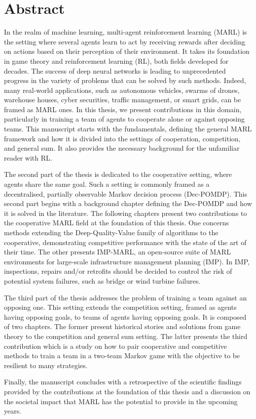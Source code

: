 
\chapter*{Abstract}

In the realm of machine learning, multi-agent reinforcement learning (MARL) is the setting where several agents learn to act by receiving rewards after deciding on actions based on their perception of their environment.
It takes its foundation in game theory and reinforcement learning (RL), both fields developed for decades.
The success of deep neural networks is leading to unprecedented progress in the variety of problems that can be solved by such methods.
Indeed, many real-world applications, such as autonomous vehicles, swarms of drones, warehouse houses, cyber securities, traffic management, or smart grids, can be framed as MARL ones.
In this thesis, we present contributions in this domain, particularly in training a team of agents to cooperate alone or against opposing teams.
This manuscript starts with the fundamentals, defining the general MARL framework and how it is divided into the settings of cooperation, competition, and general sum.
It also provides the necessary background for the unfamiliar reader with RL.

The second part of the thesis is dedicated to the cooperative setting, where agents share the same goal.
Such a setting is commonly framed as a decentralised, partially observable Markov decision process (Dec-POMDP).
This second part begins with a background chapter defining the Dec-POMDP and how it is solved in the literature.
The following chapters present two contributions to the cooperative MARL field at the foundation of this thesis.
One concerns methods extending the Deep-Quality-Value family of algorithms to the cooperative, demonstrating competitive performance with the state of the art of their time.
The other presents IMP-MARL, an open-source suite of MARL environments for large-scale infrastructure management planning (IMP).
In IMP, inspections, repairs and/or retrofits should be decided to control the risk of potential system failures, such as bridge or wind turbine failures.

The third part of the thesis addresses the problem of training a team against an opposing one.
This setting extends the competition setting, framed as agents having opposing goals, to teams of agents having opposing goals.
It is composed of two chapters.
The former present historical stories and solutions from game theory to the competition and general sum setting.
The latter presents the third contribution which is a study on how to pair cooperative and competitive methods to train a team in a two-team Markov game with the objective to be resilient to many strategies.

Finally, the manuscript concludes with a retrospective of the scientific findings provided by the contributions at the foundation of this thesis and a discussion on the societal impact that MARL has the potential to provide in the upcoming years.

